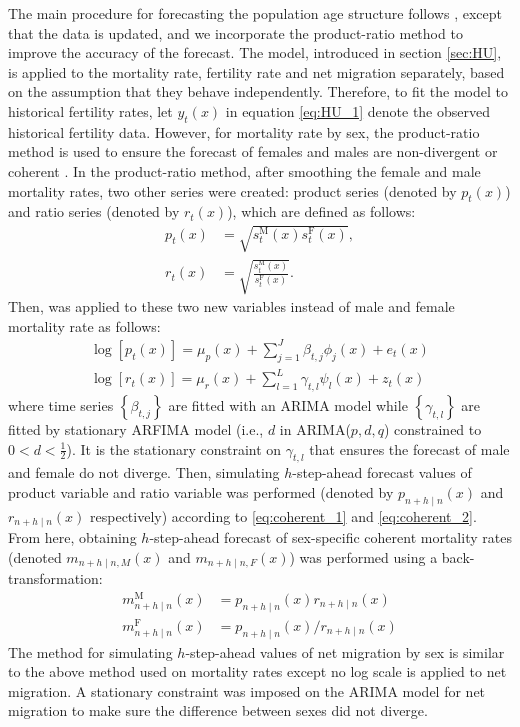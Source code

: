 \documentclass[11pt,a4paper,]{article}
\begin{document}
The main procedure for forecasting the population age structure follows \textcite{HB08}, except that the data is updated, and we incorporate the product-ratio method \autocite{HBY13} to improve the accuracy of the forecast. The \textcite{HU07} model, introduced in section \ref{sec:HU}, is applied to the mortality rate, fertility rate and net migration separately, based on the assumption that they behave independently. Therefore, to fit the model to historical fertility rates, let \(y_t(x)\) in equation \eqref{eq:HU_1} denote the observed historical fertility data. However, for mortality rate by sex, the product-ratio method is used to ensure the forecast of females and males are non-divergent or coherent \autocite{HBY13}. In the product-ratio method, after smoothing the female and male mortality rates, two other series were created: product series (denoted by \(p_t(x)\)) and ratio series (denoted by \(r_t(x)\)), which are defined as follows:
\begin{align}
  p_t(x)&=\sqrt{s_{t}^{\text{M}}(x)s_{t}^{\text{F}}(x)}, \label{eq:coherent_1}\\
  r_t(x)&=\sqrt{\frac{s_{t}^{\text{M}}(x)}{s_{t}^{\text{F}}(x)}}. \label{eq:coherent_2}
\end{align}
Then, \textcite{HU07} was applied to these two new variables instead of male and female mortality rate as follows:
\begin{align*}
  \log[p_t(x)]=\mu_p(x)+\sum_{j=1}^{J}\beta_{t,j}\phi_j(x)+e_t(x)\\
  \log[r_t(x)]=\mu_r(x)+\sum_{l=1}^{L}\gamma_{t,l}\psi_l(x)+z_t(x)
\end{align*}
where time series \(\left\{\beta_{t,j}\right\}\) are fitted with an ARIMA model while \(\left\{\gamma_{t,l}\right\}\) are fitted by stationary ARFIMA model (i.e., \(d\) in ARIMA(\(p,d,q\)) constrained to \(0<d<\frac{1}{2}\)). It is the stationary constraint on \(\gamma_{t,l}\) that ensures the forecast of male and female do not diverge. Then, simulating \(h\)-step-ahead forecast values of product variable and ratio variable was performed (denoted by \(p_{n+h\mid n}(x)\) and \(r_{n+h\mid n}(x)\) respectively) according to \eqref{eq:coherent_1} and \eqref{eq:coherent_2}. From here, obtaining \(h\)-step-ahead forecast of sex-specific coherent mortality rates (denoted \(m_{n+h\mid n,M}(x)\) and \(m_{n+h\mid n,F}(x)\)) was performed using a back-transformation:
\begin{align*}
  m_{n+h\mid n}^{\text{M}}(x) & = p_{n+h\mid n}(x)r_{n+h\mid n}(x)\\
  m_{n+h\mid n}^{\text{F}}(x) & = p_{n+h\mid n}(x)/r_{n+h\mid n}(x)
\end{align*}
The method for simulating \(h\)-step-ahead values of net migration by sex is similar to the above method used on mortality rates except no log scale is applied to net migration. A stationary constraint was imposed on the ARIMA model for net migration to make sure the difference between sexes did not diverge.
\end{document}
